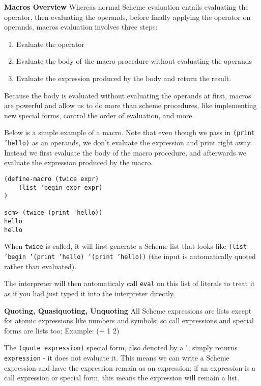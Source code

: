 \textbf{Macros Overview} Whereas normal Scheme evaluation entails evaluating the operator, then evaluating the operands, before finally applying the operator on operands, macros evaluation involves three steps:

\begin{enumerate}[1.]
\item Evaluate the operator
\item Evaluate the body of the macro procedure without evaluating the operands
\item Evaluate the expression produced by the body and return the result.
\end{enumerate}

Because the body is evaluated without evaluating the operands at first, macros are powerful and allow us to do more than scheme procedures, like implementing new special forms, control the order of evaluation, and more. 

Below is a simple example of a macro. Note that even though we pass in \texttt{(print 'hello)} as an operands, we don't evaluate the expression and print right away. Instead we first evaluate the body of the macro procedure, and afterwards we evaluate the expression produced by the macro. 
\vspace{1cm}
\begin{lstlisting}
(define-macro (twice expr)
    (list 'begin expr expr)
)

scm> (twice (print 'hello))
hello
hello
\end{lstlisting}

When \texttt{twice} is called, it will first generate a Scheme list that looks like \texttt{(list 'begin '(print 'hello) '(print 'hello))} (the input is automatically quoted rather than evaluated).

The interpreter will then automaticaly call \texttt{eval} on this list of literals to treat it as if you had just typed it into the interpreter directly. 

\newpage
\textbf{Quoting, Quasiquoting, Unquoting} All Scheme expressions are lists except for atomic expressions like numbers and symbols; so call expressions and special forms are lists too; Example: (+ 1 2)

The \texttt{(quote expression)} special form, also denoted by a \textbf{\'}, simply returns \texttt{expression} - it does not evaluate it. This means we can write a Scheme expression and have the expression remain as an expression; if an expression is a call expression or special form, this means the expression will remain a list. 


